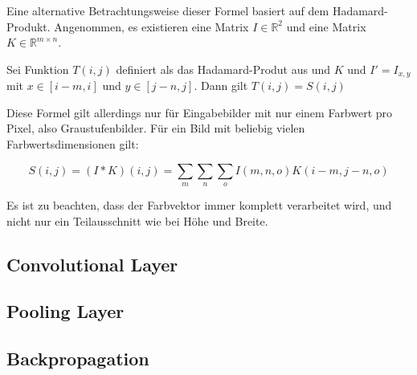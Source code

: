 Eine alternative Betrachtungsweise dieser Formel basiert auf dem Hadamard-Produkt. Angenommen, es existieren eine Matrix $I\in\mathbb{R}^{2}$ und eine Matrix $K\in\mathbb{R}^{m\times n}$.

Sei Funktion $T(i,j)$ definiert als das Hadamard-Produt aus und $K$ und $I'=I_{x, y}$ mit $x\in[i-m,i]$ und $y\in[j-n,j]$.
Dann gilt $T(i,j)=S(i,j)$

Diese Formel gilt allerdings nur für Eingabebilder mit nur einem Farbwert pro Pixel, also Graustufenbilder. Für ein Bild mit beliebig vielen Farbwertsdimensionen gilt:

\begin{equation}
S(i,j) = (I*K)(i,j) = \sum_{m}\sum_{n}\sum_{o}I(m,n,o)K(i-m,j-n,o)
\end{equation}

Es ist zu beachten, dass der Farbvektor immer komplett verarbeitet wird, und nicht nur ein Teilausschnitt wie bei Höhe und Breite.

\subsection{Convolutional Layer}
\label{ssec:convlayer}

\subsection{Pooling Layer}
\label{ssec:pooling}

\subsection{Backpropagation}
\label{ssec:backpropagation}